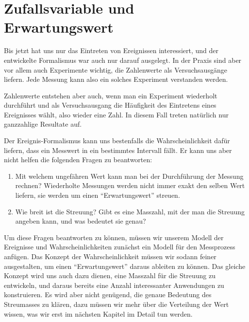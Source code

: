 %
%
%
\chapter{Zufallsvariable und Erwartungswert}
\label{chapter:erwartungswert-und-varianz}

Bis jetzt hat uns nur das Eintreten von Ereignissen interessiert, und
der entwickelte Formalismus war auch nur darauf ausgelegt.
In der Praxis sind aber vor allem auch Experimente wichtig, die
Zahlenwerte als Versuchsausgänge liefern.
Jede Messung kann also ein solches Experiment verstanden werden.

Zahlenwerte entstehen aber auch, wenn man ein Experiment wiederholt
durchführt und als Versuchsausgang die Häufigkeit des Eintretens
eines Ereignisses wählt, also wieder eine Zahl.
In diesem Fall treten natürlich nur ganzzahlige Resultate auf.

Der Ereignis-Formalismus kann uns bestenfalls die Wahrscheinlichkeit
dafür liefern, dass ein Messwert in ein bestimmtes Intervall fällt.
Er kann uns aber nicht helfen die folgenden Fragen zu beantworten:
\begin{enumerate}
\item Mit welchem ungefähren Wert kann man bei der Durchführung der
Messung rechnen?
Wiederholte Messungen werden nicht immer exakt den selben Wert liefern,
sie werden um einen ``Erwartungswert'' streuen.
\item Wie breit ist die Streuung? Gibt es eine Masszahl, mit der man
die Streuung angeben kann, und was bedeutet sie genau?
\end{enumerate}
Um diese Fragen beantworten zu können, müssen wir unserem Modell
der Ereignisse und Wahrscheinlichkeiten zunächst 
ein Modell für den Messprozess anfügen.
Das Konzept der Wahrscheinlichkeit müssen wir sodann feiner ausgestalten,
um einen ``Erwartungswert'' daraus ableiten zu können.
Das gleiche Konzept wird uns auch dazu dienen, eine Masszahl für
die Streuung zu entwickeln, und daraus bereits eine Anzahl interessanter
Anwendungen zu konstruieren.
Es wird aber nicht genügend, die genaue Bedeutung des Streumasses
zu klären, dazu müssen wir mehr über die Verteilung der Wert wissen,
was wir erst im nächsten Kapitel im Detail tun werden.









